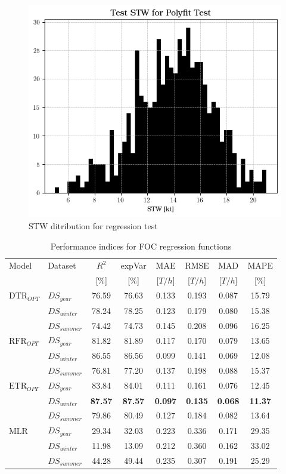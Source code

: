 \begin{figure}
    \centering
    \includegraphics[width=.6\linewidth]{02_figures/hist_dummy_stw.png}
    \caption{STW ditribution for regression test}
    \label{fig:hist_dummy_test}
\end{figure}

\begin{table}[h]
    \small
    \centering
    {\begin{tabular}{ l l c c c c c c }
    \hline
    Model & Dataset & $R^2$ & expVar & MAE & RMSE & MAD & MAPE \\
    & & [$\%$] & [$\%$] & [$T/h$] & [$T/h$] & [$T/h$] & [$\%$]  \\ 
    \hline
    $\text{DTR}_{OPT}$ & $DS_{year}$ & 76.59 & 76.63 & 0.133 & 0.193  & 0.087 & 15.79  \\
    & $DS_{winter}$ & 78.24 & 78.25 & 0.123 & 0.179 & 0.080 & 15.38 \\
    & $DS_{summer}$ & 74.42 & 74.73 & 0.145 &  0.208 & 0.096 & 16.25 \\
    $\text{RFR}_{OPT}$ & $DS_{year}$  & 81.82 & 81.89 & 0.117 & 0.170 & 0.079 & 13.65 \\
    & $DS_{winter}$ & 86.55 & 86.56 & 0.099 & 0.141 & 0.069 & 12.08 \\
    & $DS_{summer}$ & 76.81 & 77.20 & 0.137 & 0.198 & 0.088 & 15.37 \\
    $\text{ETR}_{OPT}$ & $DS_{year}$ & 83.84 & 84.01 & 0.111 & 0.161 & 0.076 & 12.45\\
    & $DS_{winter}$ & \textbf{87.57} & \textbf{87.57} & \textbf{0.097} & \textbf{0.135} & \textbf{0.068} & \textbf{11.37} \\
    & $DS_{summer}$ & 79.86 & 80.49 & 0.127 & 0.184 & 0.082 & 13.64 \\
    MLR & $DS_{year}$ & 29.34 & 32.03 & 0.223 & 0.336 & 0.171 & 29.35 \\
    & $DS_{winter}$ & 11.98 & 13.09 & 0.212 & 0.360 &0.162& 33.02 \\
    & $DS_{summer}$ & 44.28 & 49.44 & 0.235 & 0.307 & 0.191 & 25.29 \\
    \hline
    \end{tabular}}
\caption{Performance indices for FOC regression functions}\label{tbl:polyfit_scores_errors}
\end{table}










